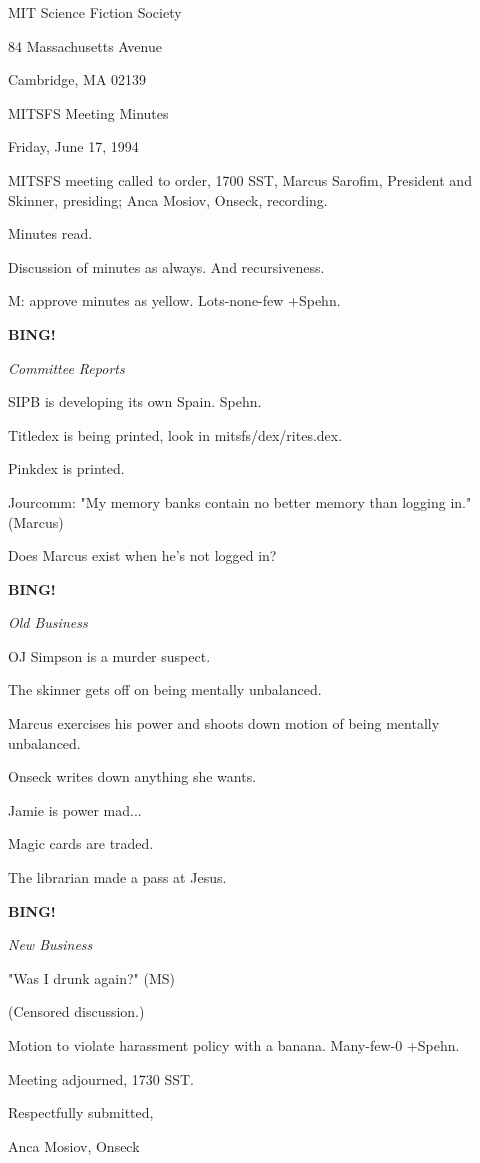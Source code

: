 \documentclass[12pt]{article}
\newcommand{\bing}{{\bf BING!} }
\newcommand{\goto}[1]{\bing \vskip 12pt \centerline{{\em{#1}}}}
\begin{document}
\begin{center}

MIT Science Fiction Society 

84 Massachusetts Avenue

Cambridge, MA 02139

\vspace{12pt}

MITSFS Meeting Minutes 

Friday, June 17, 1994

\end{center}
 
\vspace{18pt}

\setlength{\parskip}{6pt}

\noindent
MITSFS meeting called to order, 1700 SST,
Marcus Sarofim, President and Skinner, presiding; Anca Mosiov, Onseck, recording.

Minutes read.

Discussion of minutes as always. And recursiveness.

M: approve minutes as yellow. Lots-none-few +Spehn.

\goto{Committee Reports}

SIPB is developing its own Spain. Spehn.

Titledex is being printed, look in mitsfs/dex/rites.dex.

Pinkdex is printed.

Jourcomm: "My memory banks contain no better memory than logging in." (Marcus)

Does Marcus exist when he's not logged in?

\goto{Old Business}

OJ Simpson is a murder suspect.

The skinner gets off on being mentally unbalanced.

Marcus exercises his power and shoots down motion of being mentally unbalanced.

Onseck writes down anything she wants.

Jamie is power mad...

Magic cards are traded.

The librarian made a pass at Jesus.

\goto{New Business}

"Was I drunk again?" (MS)

(Censored discussion.)

Motion to violate harassment policy with a banana. Many-few-0 +Spehn.

\vspace{12pt}

\noindent
Meeting adjourned, 1730 SST.

\vspace{18pt}

\centerline{Respectfully submitted,}
\centerline{Anca Mosiov, Onseck}
\end{document}
